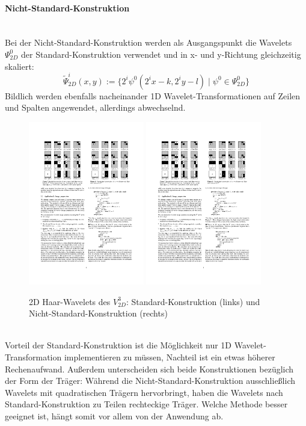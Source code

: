 \paragraph{Nicht-Standard-Konstruktion}~\\
Bei der Nicht-Standard-Konstruktion werden als Ausgangspunkt die Wavelets $\Psi^0_{2D}$ der Standard-Konstruktion verwendet und in x- und y-Richtung gleichzeitig skaliert:\begin{equation*}
	\tilde\Psi^i_{2D}(x, y):=\{2^i\psi^0(2^ix-k, 2^iy-l)\mid \psi^0 \in \Psi^0_{2D}\}
\end{equation*}Bildlich werden ebenfalls nacheinander 1D Wavelet-Transformationen auf Zeilen und Spalten angewendet, allerdings abwechselnd.
\begin{figure}[h]
	\centering
	\includegraphics[trim=79 545 300 100, clip, width=0.45\textwidth]{2d_wavelets.pdf}
	\includegraphics[trim=300 545 79 100, clip, width=0.45\textwidth]{2d_wavelets.pdf}
	\caption{2D Haar-Wavelets des $V_{2D}^3$: Standard-Konstruktion (links) und Nicht-Standard-Konstruktion (rechts)}
\end{figure}\\
Vorteil der Standard-Konstruktion ist die Möglichkeit nur 1D Wavelet-Transformation implementieren zu müssen, Nachteil ist ein etwas höherer Rechenaufwand. Außerdem unterscheiden sich beide Konstruktionen bezüglich der Form der Träger: Während die Nicht-Standard-Konstruktion ausschließlich Wavelets mit quadratischen Trägern hervorbringt, haben die Wavelets nach Standard-Konstruktion zu Teilen rechteckige Träger. Welche Methode besser geeignet ist, hängt somit vor allem von der Anwendung ab.
	
